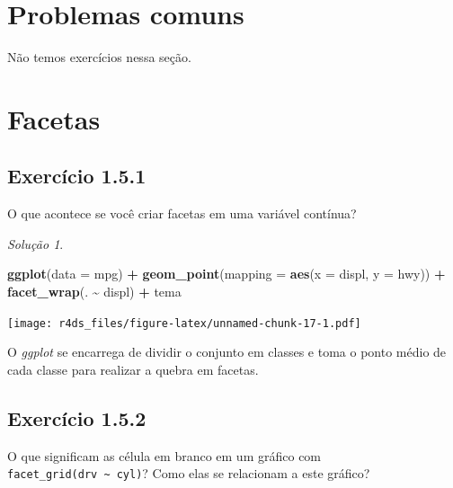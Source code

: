 \documentclass[
]{latex/krantz}
\newenvironment{Shaded}{\begin{snugshade}}{\end{snugshade}}
\newcommand{\AttributeTok}[1]{\textcolor[rgb]{0.13,0.29,0.53}{#1}}
\newcommand{\FunctionTok}[1]{\textcolor[rgb]{0.13,0.29,0.53}{\textbf{#1}}}
\newcommand{\NormalTok}[1]{#1}
\newcommand{\SpecialCharTok}[1]{\textcolor[rgb]{0.81,0.36,0.00}{\textbf{#1}}}
\theoremstyle{definition}
\theoremstyle{definition}
\theoremstyle{definition}
\theoremstyle{definition}
\theoremstyle{remark}
\newtheorem*{solution}{Solução}
\begin{document}
\hypertarget{problemas-comuns}{%
\section{Problemas comuns}\label{problemas-comuns}}

Não temos exercícios nessa seção.

\hypertarget{facetas}{%
\section{Facetas}\label{facetas}}

\hypertarget{exr1-5-1}{%
\subsection*{Exercício 1.5.1}\label{exr1-5-1}}

O que acontece se você criar facetas em uma variável contínua?

\begin{solution}
\leavevmode

\begin{Shaded}
\begin{Highlighting}[]
\FunctionTok{ggplot}\NormalTok{(}\AttributeTok{data =}\NormalTok{ mpg) }\SpecialCharTok{+}
    \FunctionTok{geom\_point}\NormalTok{(}\AttributeTok{mapping =} \FunctionTok{aes}\NormalTok{(}\AttributeTok{x =}\NormalTok{ displ, }\AttributeTok{y =}\NormalTok{ hwy)) }\SpecialCharTok{+}
    \FunctionTok{facet\_wrap}\NormalTok{(. }\SpecialCharTok{\textasciitilde{}}\NormalTok{ displ) }\SpecialCharTok{+}
\NormalTok{    tema}
\end{Highlighting}
\end{Shaded}

\texttt{[image: r4ds\_files/figure-latex/unnamed-chunk-17-1.pdf]}

O \emph{ggplot} se encarrega de dividir o conjunto em classes e toma o ponto médio de cada classe para realizar a quebra em facetas.

\end{solution}

\hypertarget{exr1-5-2}{%
\subsection*{Exercício 1.5.2}\label{exr1-5-2}}

O que significam as célula em branco em um gráfico com \texttt{facet\_grid(drv\ \textasciitilde{}\ cyl)}? Como elas se relacionam a este gráfico?
\end{document}
